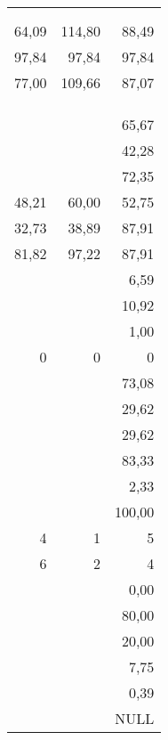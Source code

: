 \begin{tabular}{|r|r|r|}
	               &        &              \\
	               &        &              \\
	         64,09 & 114,80 &        88,49 \\
	         97,84 &  97,84 &        97,84 \\
	         77,00 & 109,66 &        87,07 \\
	               &        &              \\ \midrule
	               &        &              \\
	               &        &              \\
	               &        &        65,67 \\
	               &        &        42,28 \\
	               &        &        72,35 \\
	         48,21 &  60,00 &        52,75 \\
	         32,73 &  38,89 &        87,91 \\
	         81,82 &  97,22 &        87,91 \\
	               &        &         6,59 \\
	               &        &        10,92 \\
	               &        &         1,00 \\
	             0 &      0 &            0 \\
	               &        &        73,08 \\
	               &        &        29,62 \\
	               &        &        29,62 \\
	               &        &        83,33 \\
	               &        &         2,33 \\
	               &        &       100,00 \\
	             4 &      1 &            5 \\
	             6 &      2 &            4 \\
	               &        &         0,00 \\
	               &        &        80,00 \\
	               &        &        20,00 \\
	               &        &         7,75 \\
	               &        &         0,39 \\
	               &        &         NULL \\

\end{tabular}
